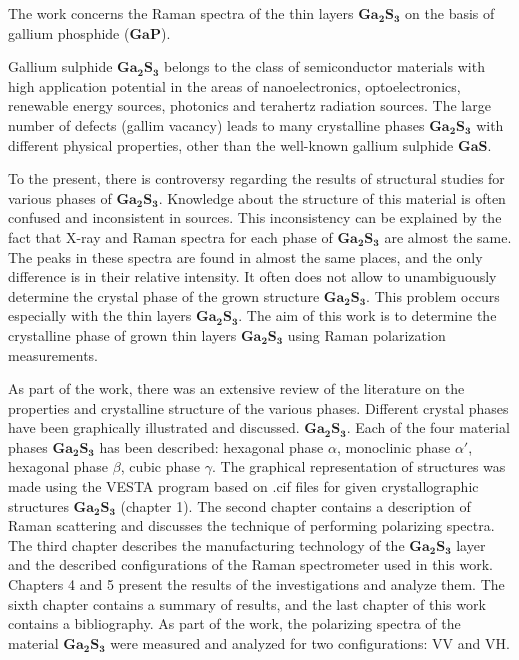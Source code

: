The work concerns the Raman spectra of the thin layers $\mathbf{Ga_{2}S_{3}}$ on the basis of gallium phosphide ($\mathbf{GaP}$).

Gallium sulphide $\mathbf{Ga_{2}S_{3}}$ belongs to the class of semiconductor materials with high application potential in the areas of nanoelectronics, optoelectronics, renewable energy sources, photonics and terahertz radiation sources. The large number of defects (gallim vacancy) leads to many crystalline phases $\mathbf{Ga_{2}S_{3}}$ with different physical properties, other than the well-known gallium sulphide $\mathbf{GaS}$.

To the present, there is controversy regarding the results of structural studies for various phases of $\mathbf{Ga_ {2} S_ {3}}$. Knowledge about the structure of this material is often confused and inconsistent in sources. This inconsistency can be explained by the fact that X-ray and Raman spectra for each phase of $\mathbf{Ga_ {2} S_ {3}}$ are almost the same. The peaks in these spectra are found in almost the same places, and the only difference is in their relative intensity. It often does not allow to unambiguously determine the crystal phase of the grown structure $\mathbf{Ga_ {2} S_ {3}}$.
This problem occurs especially with the thin layers $\mathbf{Ga_{2}S_ {3}}$. The aim of this work is to determine the crystalline phase of grown thin layers $\mathbf{Ga_{2}S_{3}}$ using Raman polarization measurements.

As part of the work, there was an extensive review of the literature on the properties and crystalline structure of the various phases. Different crystal phases have been graphically illustrated and discussed. $\mathbf{Ga_{2}S_{3}}$. Each of the four material phases $\mathbf{Ga_ {2} S_ {3}}$ has been described: hexagonal phase $\alpha$, monoclinic phase $\alpha'$, hexagonal phase $\beta$, cubic phase $\gamma$. The graphical representation of structures was made using the VESTA program based on .cif files for given crystallographic structures $\mathbf{Ga_{2}S_{3}}$ (chapter 1). The second chapter contains a description of Raman scattering and discusses the technique of performing polarizing spectra. The third chapter describes the manufacturing technology of the $\mathbf{Ga_{2}S_{3}}$ layer and the described configurations of the Raman spectrometer used in this work. Chapters 4 and 5 present the results of the investigations and analyze them. The sixth chapter contains a summary of results, and the last chapter of this work contains a bibliography. As part of the work, the polarizing spectra of the material $\mathbf{Ga_{2}S_{3}}$ were measured and analyzed for two configurations: VV and VH.

